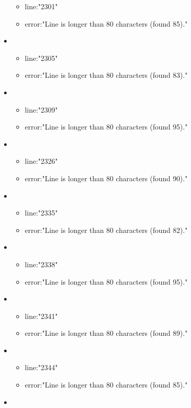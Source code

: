 \begin{itemize}
\begin{itemize}
		\item line:"2301" 
		\item error:"Line is longer than 80 characters (found 85)." 
	\end{itemize}
	\item 
	\begin{itemize} 
		\item line:"2305" 
		\item error:"Line is longer than 80 characters (found 83)." 
	\end{itemize}
	\item 
	\begin{itemize} 
		\item line:"2309" 
		\item error:"Line is longer than 80 characters (found 95)." 
	\end{itemize}
	\item 
	\begin{itemize} 
		\item line:"2326" 
		\item error:"Line is longer than 80 characters (found 90)." 
	\end{itemize}
	\item 
	\begin{itemize} 
		\item line:"2335" 
		\item error:"Line is longer than 80 characters (found 82)." 
	\end{itemize}
	\item 
	\begin{itemize} 
		\item line:"2338" 
		\item error:"Line is longer than 80 characters (found 95)." 
	\end{itemize}
	\item 
	\begin{itemize} 
		\item line:"2341" 
		\item error:"Line is longer than 80 characters (found 89)." 
	\end{itemize}
	\item 
	\begin{itemize} 
		\item line:"2344" 
		\item error:"Line is longer than 80 characters (found 85)." 
	\end{itemize}
	\item 
	\begin{itemize} 

\end{itemize}
\end{itemize}
